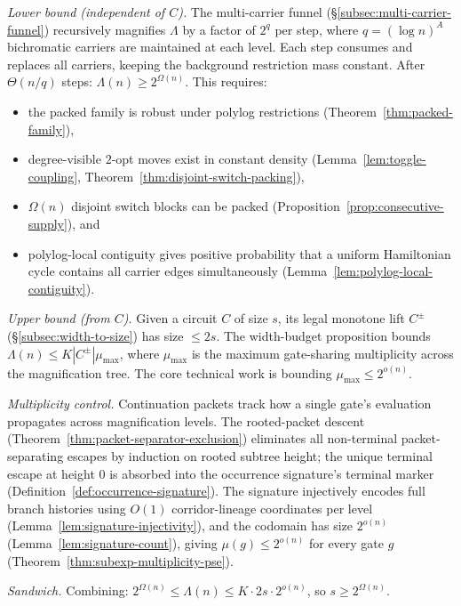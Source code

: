 \documentclass[11pt]{article}
\begin{document}
\emph{Lower bound (independent of $C$).}
The multi-carrier funnel (\S\ref{subsec:multi-carrier-funnel})
recursively magnifies $\Lambda$ by a factor of $2^q$ per step, where
$q = (\log n)^A$ bichromatic carriers are maintained at each level.
Each step consumes and replaces all carriers, keeping the background
restriction mass constant.  After $\Theta(n/q)$ steps:
$\Lambda(n) \ge 2^{\Omega(n)}$.  This requires:
\begin{itemize}
\item the packed family is robust under polylog restrictions
  (Theorem~\ref{thm:packed-family}),
\item degree-visible $2$-opt moves exist in constant density
  (Lemma~\ref{lem:toggle-coupling},
   Theorem~\ref{thm:disjoint-switch-packing}),
\item $\Omega(n)$ disjoint switch blocks can be packed
  (Proposition~\ref{prop:consecutive-supply}), and
\item polylog-local contiguity gives positive probability that a
  uniform Hamiltonian cycle contains all carrier edges simultaneously
  (Lemma~\ref{lem:polylog-local-contiguity}).
\end{itemize}

\emph{Upper bound (from $C$).}
Given a circuit $C$ of size $s$, its legal monotone lift $C^{\pm}$
(\S\ref{subsec:width-to-size}) has size $\le 2s$.  The width-budget
proposition bounds $\Lambda(n) \le K |C^{\pm}| \mu_{\max}$, where
$\mu_{\max}$ is the maximum gate-sharing multiplicity across the
magnification tree.  The core technical work is bounding
$\mu_{\max} \le 2^{o(n)}$.

\emph{Multiplicity control.}
Continuation packets track how a single gate's evaluation propagates
across magnification levels.
The rooted-packet descent
(Theorem~\ref{thm:packet-separator-exclusion}) eliminates all
non-terminal packet-separating escapes by induction on rooted subtree
height; the unique terminal escape at height $0$ is absorbed into the
occurrence signature's terminal marker
(Definition~\ref{def:occurrence-signature}).  The signature
injectively encodes full branch histories using $O(1)$
corridor-lineage coordinates per level
(Lemma~\ref{lem:signature-injectivity}), and the codomain has size
$2^{o(n)}$ (Lemma~\ref{lem:signature-count}), giving
$\mu(g) \le 2^{o(n)}$ for every gate $g$
(Theorem~\ref{thm:subexp-multiplicity-pse}).

\emph{Sandwich.}
Combining: $2^{\Omega(n)} \le \Lambda(n) \le K \cdot 2s \cdot
2^{o(n)}$, so $s \ge 2^{\Omega(n)}$.
\end{document}
